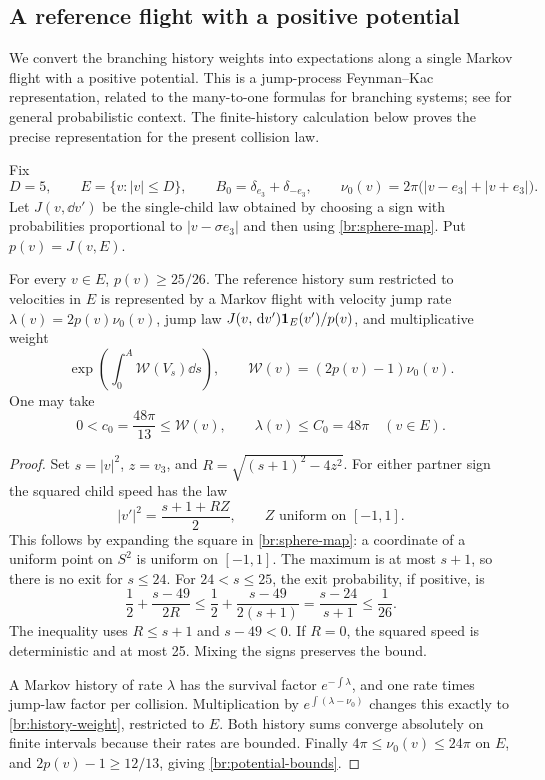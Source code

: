 \subsection{A reference flight with a positive potential}

We convert the branching history weights into expectations along a
single Markov flight with a positive potential. This is a jump-process
Feynman--Kac representation, related to the many-to-one formulas for
branching systems; see \cite[Section~4.1]{HarrisRoberts2017} for general
probabilistic context. The finite-history calculation below proves the
precise representation for the present collision law.

Fix
\[
D=5,\qquad E=\{v:|v|\le D\},\qquad
B_0=\delta_{e_3}+\delta_{-e_3},\qquad
\nu_0(v)=2\pi\bigl(|v-e_3|+|v+e_3|\bigr).
\]
Let \(J(v,\dd v')\) be the single-child law obtained by choosing a sign
with probabilities proportional to \(|v-\sigma e_3|\) and then using
\eqref{br:sphere-map}. Put \(p(v)=J(v,E)\).

\begin{lemma}\label{br:retention}
For every \(v\in E\), \(p(v)\ge25/26\).
The reference history sum restricted to velocities in \(E\) is represented
by a Markov flight with velocity jump rate
\(\lambda(v)=2p(v)\nu_0(v)\), jump law
\(J(v,\,\mathrm d v')\mathbf 1_E(v')/p(v)\), and multiplicative weight
\[
\exp\left(\int_0^A \mathcal W(V_s)\dd s\right),
\qquad \mathcal W(v)=(2p(v)-1)\nu_0(v).
\]
One may take
\begin{equation}\label{br:potential-bounds}
0<c_0=\frac{48\pi}{13}\le \mathcal W(v),\qquad
\lambda(v)\le C_0=48\pi\quad(v\in E).
\end{equation}
\end{lemma}

\begin{proof}
Set \(s=|v|^2\), \(z=v_3\), and
\(R=\sqrt{(s+1)^2-4z^2}\). For either partner sign the squared child
speed has the law
\[
|v'|^2=\frac{s+1+RZ}{2},
\qquad Z\text{ uniform on }[-1,1].
\]
This follows by expanding the square in \eqref{br:sphere-map}: a
coordinate of a uniform point on \(S^2\) is uniform on \([-1,1]\).
The maximum is at most \(s+1\), so there is no exit for \(s\le24\).
For \(24<s\le25\), the exit probability, if positive, is
\[
\frac12+\frac{s-49}{2R}
\le\frac12+\frac{s-49}{2(s+1)}
=\frac{s-24}{s+1}\le\frac1{26}.
\]
The inequality uses \(R\le s+1\) and \(s-49<0\). If \(R=0\), the
squared speed is deterministic and at most 25. Mixing the signs
preserves the bound.

A Markov history of rate \(\lambda\) has the survival factor
\(e^{-\int\lambda}\), and one rate times jump-law factor per collision.
Multiplication by \(e^{\int(\lambda-\nu_0)}\) changes this exactly to
\eqref{br:history-weight}, restricted to \(E\). Both history sums
converge absolutely on finite intervals because their rates are bounded.
Finally \(4\pi\le\nu_0(v)\le24\pi\) on \(E\), and
\(2p(v)-1\ge12/13\), giving \eqref{br:potential-bounds}.
\end{proof}

